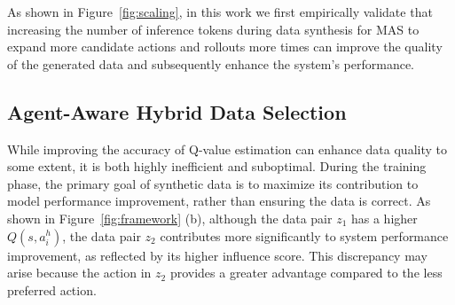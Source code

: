 As shown in Figure~\ref{fig:scaling}, in this work we first empirically validate that increasing the number of inference tokens during data synthesis for MAS to expand more candidate actions and rollouts more times can improve the quality of the generated data and subsequently enhance the system's performance.

\subsection{Agent-Aware Hybrid Data Selection}
\label{subsection:hybrid data selection}


While improving the accuracy of Q-value estimation can enhance data quality to some extent, it is both highly inefficient and suboptimal. During the training phase, the primary goal of synthetic data is to maximize its contribution to model performance improvement, rather than ensuring the data is correct. As shown in Figure~\ref{fig:framework} (b), although the data pair $z_1$ has a higher $Q(s,a_i^h)$, the data pair $z_2$ contributes more significantly to system performance improvement, as reflected by its higher influence score. This discrepancy may arise because the action in $z_2$ provides a greater advantage compared to the less preferred action.

